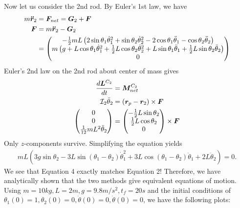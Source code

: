 \documentclass[11pt]{article}
\begin{document}
Now let us consider the 2nd rod. By Euler's 1st law, we have
\begin{align*}
	m {\bm{ \ddot{r}}}_2 &= {\bm{ F}}_{net} = {\bm{ G}}_2  + {\bm{ F}}   \\
	{\bm{ F}} &= m {\bm{ \ddot{r}}}_2 - {\bm{ G}}_2   \\
	&= \begin{pmatrix} -\frac{1}{2}mL \left( 2 \sin \theta_1 \dot{\theta}_1^2 + \sin \theta_2 \dot{\theta}_2^2  - 2 \cos \theta_1 \ddot{\theta}_1 - \cos \theta_2 \ddot{\theta}_2 \right) \\ m \left( g + L \cos \theta_1 \dot{\theta}_1^2 + \frac{1}{2} L \cos\theta_2 \dot{\theta}_2^2  + L \sin \theta_1 \ddot{\theta}_1 + \frac{1}{2} L \sin\theta_2 \ddot{\theta}_2  \right) \\0 \end{pmatrix}  
\end{align*}
Euler's 2nd law on the 2nd rod about center of mass gives
\begin{align*}
	\frac{d {\bm{ L}}^{C_2} }{ dt} &= {\bm{ M}}_{net}^{C_2}  \\
	\mathcal{ I}_2 \ddot{\theta}_2 &= ({\bm{ r}}_p - {\bm{ r}}_2)  \times {\bm{ F}}  \\
	\begin{pmatrix} 0\\0\\ \frac{1}{12} mL^2 \ddot{\theta}_2 \end{pmatrix} &= \begin{pmatrix} -\frac{1}{2} L \sin \theta_2 \\ \frac{1}{2} L \cos \theta_2 \\0 \end{pmatrix} \times {\bm{ F}}  
\end{align*}
Only $ z$-components survive. Simplifying the equation yields
\begin{align}
	mL \left( 3g \sin \theta_2 - 3L \sin (\theta_1 - \theta_2) \dot{\theta}_1^2 + 3L \cos (\theta_1 - \theta_2) \ddot{\theta}_1 + 2L \ddot{\theta}_2 \right) = 0 .
\end{align}
We see that Equation 4 exactly matches Equation 2! Therefore, we have analytically shown that the two methods give equivalent equations of motion. Using $ m = 10 kg, L = 2m, g=9.8 m /s ^2, t_f = 20s$ and the initial conditions of $ \theta_1(0) = 1, \theta_2(0) = 0, \dot{\theta}(0) = 0, \dot{\theta}(0) =0$, we have the following plots:
\end{document}
